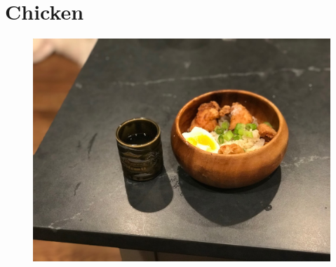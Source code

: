 \documentclass[11pt]{report}
\begin{document}
\chapter{Chicken}
\begin{figure}[h]
\begin{center}
   \includegraphics[width=\linewidth]{images/IMG_2109.jpg}
\end{center}
\end{figure}
\newpage






\end{document}
